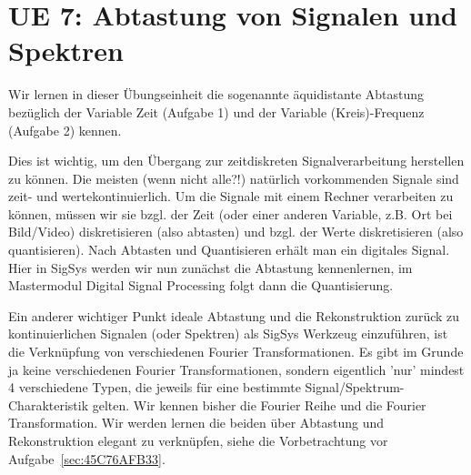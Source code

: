 \clearpage
\section{UE 7: Abtastung von Signalen und Spektren}

Wir lernen in dieser Übungseinheit die sogenannte äquidistante Abtastung bezüglich
der Variable Zeit (Aufgabe 1) und der Variable (Kreis)-Frequenz (Aufgabe 2) kennen.
%

Dies ist wichtig, um den Übergang zur zeitdiskreten Signalverarbeitung
herstellen zu können.
%
Die meisten (wenn nicht alle?!) natürlich vorkommenden Signale sind zeit- und
wertekontinuierlich.
%
Um die Signale mit einem Rechner verarbeiten zu können, müssen wir sie bzgl. der
Zeit (oder einer anderen Variable, z.B. Ort bei Bild/Video)
diskretisieren (also abtasten) und bzgl. der Werte diskretisieren
(also quantisieren).
%
Nach Abtasten und Quantisieren erhält man ein digitales Signal.
%
Hier in SigSys werden wir nun zunächst die Abtastung kennenlernen, im Mastermodul
Digital Signal Processing folgt dann die Quantisierung.
%

Ein anderer wichtiger Punkt ideale Abtastung und die Rekonstruktion zurück
zu kontinuierlichen Signalen (oder Spektren) als SigSys Werkzeug einzuführen, ist
die Verknüpfung von verschiedenen Fourier Transformationen.
%
Es gibt im Grunde ja keine verschiedenen Fourier Transformationen, sondern
eigentlich 'nur' mindest 4 verschiedene Typen, die jeweils für eine bestimmte
Signal/Spektrum-Charakteristik gelten.
%
Wir kennen bisher die Fourier Reihe und die Fourier Transformation.
%
Wir werden lernen die beiden über Abtastung und Rekonstruktion elegant zu
verknüpfen, siehe die Vorbetrachtung vor Aufgabe~\ref{sec:45C76AFB33}.

